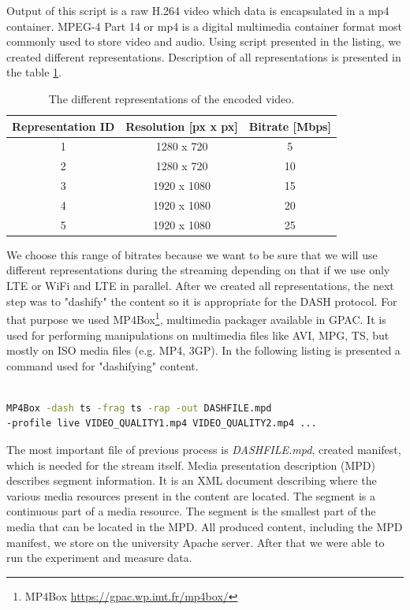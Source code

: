 \documentclass{llncs}
\begin{document}
Output of this script is a raw H.264 video which data is encapsulated in a mp4 container. MPEG-4 Part 14 or mp4 is a digital multimedia container format most commonly used to store video and audio. Using script presented in the listing, we created different representations. Description of all representations is presented in the table \ref{tab:repr}.

\begin{table}
\centering
\begin{tabular}{c|c|c}
Representation ID & Resolution [px x px] & Bitrate [Mbps] \\\hline
1 & 1280 x 720 & 5 \\
2 & 1280 x 720 & 10 \\
3 & 1920 x 1080 & 15 \\
4 & 1920 x 1080 & 20 \\
5 & 1920 x 1080 & 25 \\
\end{tabular}
\caption{\label{tab:repr}The different representations of the encoded video.}
\end{table}

We choose this range of bitrates because we want to be sure that we will use different representations during the streaming depending on that if we use only LTE or WiFi and LTE in parallel. After we created all representations, the next step was to "dashify" the content so it is appropriate for the DASH protocol. For that purpose we used MP4Box\footnote{MP4Box \url{https://gpac.wp.imt.fr/mp4box/}}, multimedia packager available in GPAC. It is used for performing  manipulations on multimedia files like AVI, MPG, TS, but mostly on ISO media files (e.g. MP4, 3GP). In the following listing is presented a command used for "dashifying" content.

\begin{lstlisting}[language=bash, caption={\label{l:command}Command for dashyfing content using MP4Box.}, captionpos=b]

MP4Box -dash ts -frag ts -rap -out DASHFILE.mpd 
-profile live VIDEO_QUALITY1.mp4 VIDEO_QUALITY2.mp4 ...
\end{lstlisting} 

The most important file of previous process is \emph{DASHFILE.mpd}, created manifest, which is needed for the stream itself. Media presentation description (MPD) describes segment information. It is an XML document describing where the various media resources present in the content are located. The segment is  a continuous part of a media resource. The segment is the smallest part of the media that can be located in the MPD. All produced content, including the MPD manifest, we store on the university Apache server. After that we were able to run the experiment and measure data.
\end{document}
